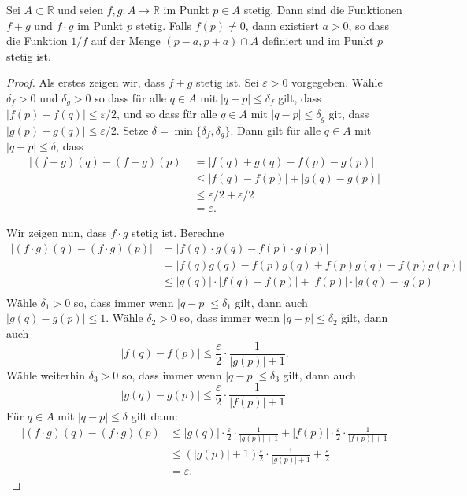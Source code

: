 \documentclass[../main.tex]{subfiles}
\begin{document}
\begin{lemma*}
  Sei $A \subset \mathbb{R}$ und seien
  $f, g \colon A \to \mathbb{R}$ im Punkt
  $p \in A$ stetig. Dann sind die Funktionen
  $f + g$ und $f \cdot g$ 
  im Punkt $p$ stetig.
  Falls $f(p) \neq 0$, dann
  existiert $a > 0$, so dass
  die Funktion $1/f$ auf der Menge
  $(p- a, p + a) \cap A$ definiert und 
  im Punkt $p$ stetig ist.
\end{lemma*}

\begin{proof}
  Als erstes zeigen wir,
  dass $f  + g$ stetig ist.
  Sei $\varepsilon > 0$ vorgegeben.
  Wähle $\delta_f > 0$ und  $\delta_g > 0$ 
  so dass für alle $q \in A$ mit
  $|q - p| \leq \delta_f$ gilt, dass
  $|f(p) - f(q)| \leq \varepsilon/2$,
  und so dass für alle
  $q \in A$ mit $|q - p| \leq \delta_g$ 
  git, dass
  $|g(p) - g(q)| \leq \varepsilon/2$.
  Setze $\delta = \min \{\delta_f, \delta_g\}$.
  Dann gilt für alle $q \in A$ mit
  $|q - p| \leq \delta$, dass
  \begin{align*}
  |(f + g)(q) - (f + g)(p)| &     = |f(q) + g(q) - f(p) - g(p)|\\
                            & \leq |f(q) - f(p)| + |g(q) - g(p)|\\
                            & \leq \varepsilon/2 + \varepsilon/2\\
                            &= \varepsilon.
  \end{align*}

  Wir zeigen nun, dass $f \cdot g$ stetig ist.
  Berechne
  \begin{align*}
     |(f\cdot g)(q) - (f \cdot g)(p)|
     & = |f(q) \cdot g(q) - f(p) \cdot g(p)| \\
     & = |f(q)g(q) - f(p)g(q) + f(p)g(q) - f(p) g(p)| \\
     & \leq |g(q)| \cdot |f(q) - f(p)| + 
     |f(p)| \cdot |g(q) - \cdot g(p)| \\
  \end{align*}
  Wähle $\delta_1 > 0$ so, dass immer wenn
  $|q - p| \leq \delta_1$ gilt, dann auch
  $|g(q) - g(p)| \leq 1$. Wähle
  $\delta_2 > 0$ so, dass immer
  wenn $|q - p| \leq \delta_2$ gilt, dann auch
  \[
    |f(q) - f(p)| \leq \frac{\varepsilon}{2} \cdot
    \frac{1}{|g(p)| + 1}.
  \]
  Wähle weiterhin $\delta_3 > 0$ so, dass immer wenn
  $|q - p| \leq \delta_3$ gilt, dann auch
  \[
    |g(q) - g(p)| \leq \frac{\varepsilon}{2} \cdot
    \frac{1}{|f(p)| + 1}.
  \]
  Für $q \in A$ mit $|q - p| \leq \delta$ gilt dann:
  \begin{align*}
    |(f \cdot g)(q) - (f \cdot g)(p)
    &\leq |g(q)| \cdot \frac{\varepsilon}{2} \cdot  
    \frac{1}{|g(p)| + 1}
    + |f(p)| \cdot \frac{\varepsilon}{2}
    \cdot \frac{1}{|f(p)| + 1}\\
    & \leq (|g(p)| + 1) \frac{\varepsilon}{2}
    \cdot \frac{1}{|g(p)| + 1} + \frac{\varepsilon}{2}  \\
    &= \varepsilon.
  \end{align*}
  

\end{proof}
\end{document}
